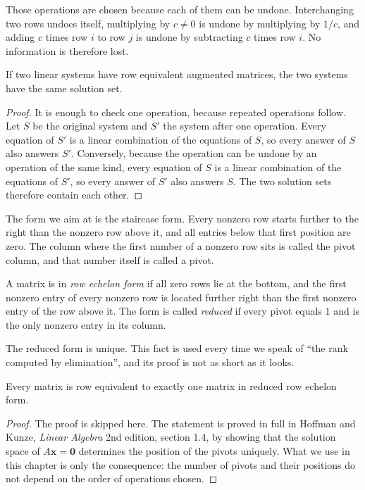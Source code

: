 Those operations are chosen because each of them can be undone. Interchanging two rows undoes
itself, multiplying by $c\neq0$ is undone by multiplying by $1/c$, and adding $c$ times row $i$
to row $j$ is undone by subtracting $c$ times row $i$. No information is therefore lost.

\begin{teorema}
If two linear systems have row equivalent augmented matrices, the two systems have the same
solution set.
\end{teorema}

\begin{proof}
It is enough to check one operation, because repeated operations follow. Let $S$ be the
original system and $S'$ the system after one operation. Every equation of $S'$ is a linear
combination of the equations of $S$, so every answer of $S$ also answers $S'$. Conversely,
because the operation can be undone by an operation of the same kind, every equation of $S$ is
a linear combination of the equations of $S'$, so every answer of $S'$ also answers $S$. The two
solution sets therefore contain each other.
\end{proof}

The form we aim at is the staircase form. Every nonzero row starts further to the right than
the nonzero row above it, and all entries below that first position are zero. The column where
the first number of a nonzero row sits is called the pivot column, and that number itself is
called a pivot.

\begin{definisi}
A matrix is in \emph{row echelon form} if all zero rows lie at the bottom, and the first
nonzero entry of every nonzero row is located further right than the first nonzero entry of the
row above it. The form is called \emph{reduced} if every pivot equals $1$ and is the only
nonzero entry in its column.
\end{definisi}

The reduced form is unique. This fact is used every time we speak of ``the rank computed by
elimination'', and its proof is not as short as it looks.

\begin{teorema}
Every matrix is row equivalent to exactly one matrix in reduced row echelon form.
\end{teorema}

\begin{proof}
The proof is skipped here. The statement is proved in full in Hoffman and Kunze,
\emph{Linear Algebra} 2nd edition, section 1.4, by showing that the solution space of
$A\mathbf{x}=\mathbf{0}$ determines the position of the pivots uniquely. What we use in this
chapter is only the consequence: the number of pivots and their positions do not depend on the
order of operations chosen.
\end{proof}

